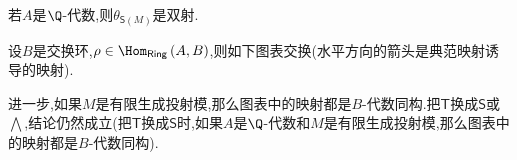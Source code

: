 \begin{proposition}{}{}
	若$A$是$\Q$-代数,则$\theta_{\mathsf{S}\left(M\right)}$是双射.
\end{proposition}

\begin{remark}{}{}
	设$B$是交换环,$\rho\in\Hom_{\mathsf{Ring}}\left(A,B\right)$,则如下图表交换(水平方向的箭头是典范映射诱导的映射).
	\begin{center}
	\end{center}
	进一步,如果$M$是有限生成投射模,那么图表中的映射都是$B$-代数同构.把$\mathsf{T}$换成$\mathsf{S}$或$\bigwedge$,结论仍然成立(把$\mathsf{T}$换成$\mathsf{S}$时,如果$A$是$\Q$-代数和$M$是有限生成投射模,那么图表中的映射都是$B$-代数同构).
\end{remark}








